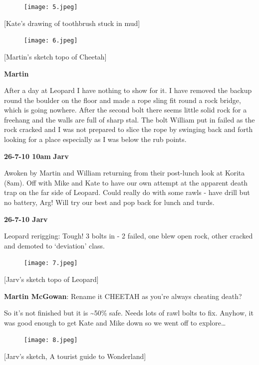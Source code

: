 \begin{figure}[htbp]
\centering
\texttt{[image: 5.jpeg]}
\caption{}
\end{figure}

{[}Kate's drawing of toothbrush stuck in mud{]}

\begin{figure}[htbp]
\centering
\texttt{[image: 6.jpeg]}
\caption{}
\end{figure}

{[}Martin's sketch topo of Cheetah{]}

\textbf{Martin}

After a day at Leopard I have nothing to show for it. I have removed the
backup round the boulder on the floor and made a rope sling fit round a
rock bridge, which is going nowhere. After the second bolt there seems
little solid rock for a freehang and the walls are full of sharp stal.
The bolt William put in failed as the rock cracked and I was not
prepared to slice the rope by swinging back and forth looking for a
place especially as I was below the rub points.

\textbf{26-7-10 10am} \textbf{Jarv}

Awoken by Martin and William returning from their post-lunch look at
Korita (8am). Off with Mike and Kate to have our own attempt at the
apparent death trap on the far side of Leopard. Could really do with
some rawls - have drill but no battery, Arg! Will try our best and pop
back for lunch and turds.

\textbf{26-7-10 Jarv}

Leopard rerigging: Tough! 3 bolts in - 2 failed, one blew open rock,
other cracked and demoted to `deviation' class.

\begin{figure}[htbp]
\centering
\texttt{[image: 7.jpeg]}
\caption{}
\end{figure}

{[}Jarv's sketch topo of Leopard{]}

\textbf{Martin McGowan}: Rename it CHEETAH as you're always cheating
death?

So it's not finished but it is \textasciitilde{}50\% safe. Needs lots of
rawl bolts to fix. Anyhow, it was good enough to get Kate and Mike down
so we went off to explore\ldots{}

\begin{figure}[htbp]
\centering
\texttt{[image: 8.jpeg]}
\caption{}
\end{figure}

{[}Jarv's sketch, A tourist guide to Wonderland{]}

